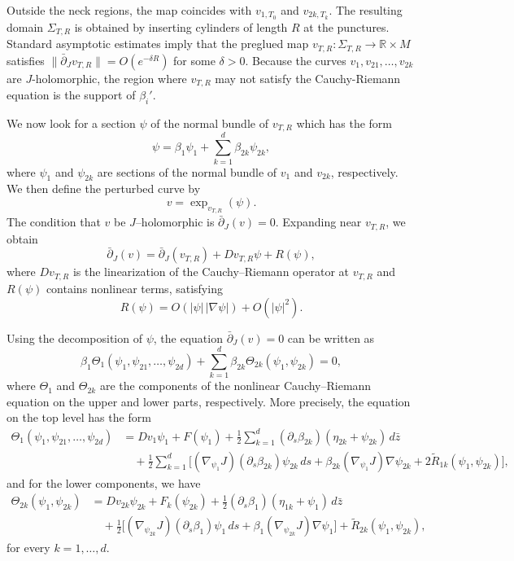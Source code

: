 \documentclass{amsart}
\newcommand{\R}{\mathbb{R}}
\begin{document}
Outside the neck regions, the map coincides with
$v_{1,T_0}$ and $v_{2k,T_k}$.
The resulting domain $\Sigma_{T,R}$ is obtained by inserting
cylinders of length $R$ at the punctures. Standard asymptotic estimates imply that the preglued map $v_{T,R}:\Sigma_{T,R} \to \R \times M$ satisfies
$\|\bar\partial_J v_{T,R}\| = O(e^{-\delta R})$
for some $\delta>0$.
Because the curves $v_1,v_{21},\ldots,v_{2k}$ are $J$-holomorphic, the region where $v_{T,R}$ may not satisfy the Cauchy-Riemann equation is the support of $\beta_i'$.

We now look for a section $\psi$ of the normal bundle of $v_{T,R}$ which has the form
$$
\psi=\beta_1\psi_1+\sum_{k=1}^d \beta_{2k}\psi_{2k},
$$
where
$\psi_1$ and $\psi_{2k}$ are sections of the normal bundle of $v_1$ and $v_{2k}$, respectively. 
We then define the perturbed curve by
$$
v=\exp_{v_{T,R}}(\psi).
$$
The condition that $v$ be $J$--holomorphic is $\bar\partial_J(v)=0.$
Expanding near $v_{T,R}$, we obtain
$$
\bar\partial_J(v)
=
\bar\partial_J(v_{T,R})
+
Dv_{T,R}\psi
+
R(\psi),$$
where $Dv_{T,R}$ is the linearization of the Cauchy--Riemann operator at $v_{T,R}$ and $R(\psi)$ contains  nonlinear terms, satisfying
$$
R(\psi)=O(|\psi|\,|\nabla\psi|)+O(|\psi|^2).
$$

Using the decomposition of $\psi$, the equation
$\bar\partial_J(v)=0$ can be written as
$$
\beta_1\Theta_1(\psi_1,\psi_{21},\dots,\psi_{2d})
+
\sum_{k=1}^d \beta_{2k}\Theta_{2k}(\psi_1,\psi_{2k})
=0,
$$
where $\Theta_1$ and $\Theta_{2k}$ are the components of the nonlinear
Cauchy--Riemann equation on the upper and lower parts, respectively.
More precisely, the equation on the top level has the form
\begin{align*}
\Theta_1(\psi_1,\psi_{21},\dots,\psi_{2d})
&=
Dv_1\psi_1+F(\psi_1)
+\frac12\sum_{k=1}^d (\partial_s\beta_{2k})(\eta_{2k}+\psi_{2k})\,d\bar z \\
&\quad
+\frac12\sum_{k=1}^d
\Big[
(\nabla_{\psi_1}J)(\partial_s\beta_{2k})\psi_{2k}\,ds
+\beta_{2k}(\nabla_{\psi_1}J)\nabla\psi_{2k}
+2\widetilde R_{1k}(\psi_1,\psi_{2k})
\Big],
\end{align*}
and for the lower components, we have
\begin{align*}
\Theta_{2k}(\psi_1,\psi_{2k})
&=
Dv_{2k}\psi_{2k}+F_k(\psi_{2k})
+\frac12(\partial_s\beta_1)(\eta_{1k}+\psi_1)\,d\bar z \\
&\quad
+\frac12
\Big[
(\nabla_{\psi_{2k}}J)(\partial_s\beta_1)\psi_1\,ds
+\beta_1(\nabla_{\psi_{2k}}J)\nabla\psi_1
\Big]
+\widetilde R_{2k}(\psi_1,\psi_{2k}),
\end{align*}
for every $k=1,\ldots, d$.
\end{document}
